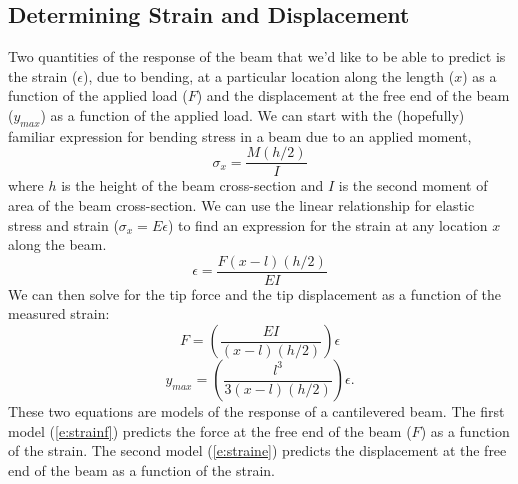 \subsection{Determining Strain and Displacement}
Two quantities of the response of the beam that we'd like to be able to predict is the strain ($\epsilon$), due to bending, at a particular location along the length ($x$) as a function of the applied load ($F$) and the displacement at the free end of the beam ($y_{max}$) as a function of the applied load.  We can start with the (hopefully) familiar expression for bending stress in a beam due to an applied moment,
\[
\sigma_x=\frac{M(h/2)}{I}
\]
where $h$ is the height of the beam cross-section and $I$ is the second moment of area of the beam cross-section.  We can use the linear relationship for elastic stress and strain ($\sigma_x = E \epsilon$) to find an expression for the strain at any location $x$ along the beam.
\begin{equation}\label{e:eps}
\epsilon = \frac{F(x-l)(h/2)}{EI}
\end{equation}
We can then solve for the tip force and the tip displacement as a function of the measured strain:
\begin{equation}\label{e:strainf}
F = \left( \frac{EI}{(x-l)(h/2)} \right) \epsilon 
\end{equation}
\begin{equation}\label{e:straine}
y_{max}=\left( \frac{l^3}{3(x-l)(h/2)} \right) \epsilon.
\end{equation}
These two equations are models of the response of a cantilevered beam. The first model (\ref{e:strainf}) predicts the force at the free end of the beam ($F$) as a function of the strain.  The second model (\ref{e:straine}) predicts the displacement at the free end of the beam as a function of the strain.

